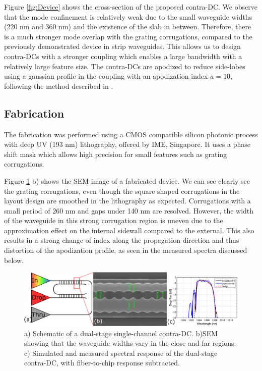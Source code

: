 \documentclass[letterpaper,10pt]{article}
\begin{document}
	Figure \ref{fig:Device} shows the  cross-section of the proposed contra-DC. We observe that the mode confinement is relatively weak due to the small waveguide widths (220 nm and 360 nm) and the existence of the slab in between. Therefore, there is a much stronger mode overlap with the grating corrugations, compared to the previously demonstrated device in strip waveguides. This allows us to design contra-DCs with a stronger coupling which enables a large bandwidth with a relatively large feature size. The contra-DCs are apodized to reduce side-lobes using a gaussian profile in the coupling with an apodization index $a=10$, following the method described in \cite{shi2013siliconContraDC}.
	
	\subsection{Fabrication}
	The fabrication was performed using a CMOS compatible silicon photonic process with deep UV (193 nm) lithography, offered by IME, Singapore. It uses a phase shift mask which allows high precision for small features such as grating corrugations. 
	
	Figure \ref{fig:litho} b) shows the SEM image of a fabricated device. We can see clearly see the grating corrugations, even though the square shaped corrugations in the layout design are smoothed in the lithography as expected. Corrugations with a small period of 260 nm and gaps under 140 nm are resolved. However, the width of the waveguide in this strong corrugation region is uneven due to the approximation effect on the internal sidewall compared to the external. This also results in a strong change of index along the propagation direction and thus distortion of the apodization profile, as seen in the measured spectra discussed below.
	
	\begin{figure}[htbp]
		\centering
		\includegraphics[width=.99\columnwidth]{SingleFilterFig}
		\caption{ a) Schematic of a dual-stage single-channel contra-DC. b)SEM showing that the waveguide widths vary in the close and far regions. c) Simulated and measured spectral response of the dual-stage contra-DC, with fiber-to-chip response subtracted.}
		\label{fig:litho}
	\end{figure}
	
\end{document}
